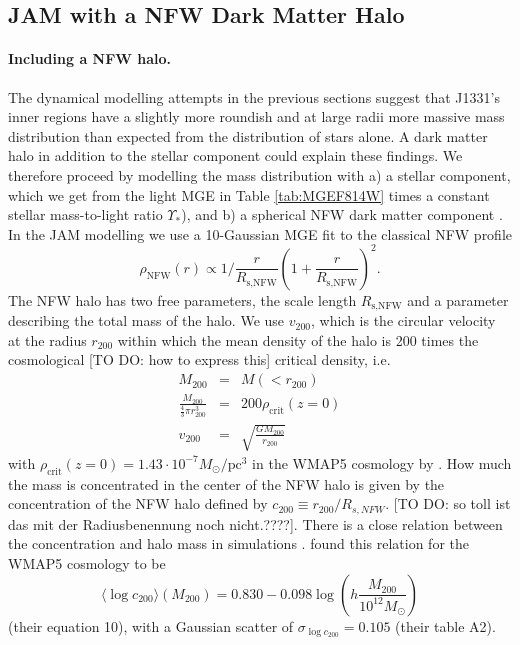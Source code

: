 \subsection{JAM with a NFW Dark Matter Halo}

\paragraph{Including a NFW halo.} The dynamical modelling attempts in the previous sections suggest that J1331's inner regions have a slightly more roundish and at large radii more massive mass distribution than expected from the distribution of stars alone. A dark matter halo in addition to the stellar component could explain these findings. We therefore proceed by modelling the mass distribution with a) a stellar component, which we get from the light MGE in Table \ref{tab:MGEF814W} times a constant stellar mass-to-light ratio $\Upsilon_*$), and b) a spherical NFW dark matter component \citep{Navarro+1995c,NFW96}. In the JAM modelling we use a 10-Gaussian MGE fit to the classical NFW profile
\begin{equation*}
\rho_\text{NFW}(r) \propto 1 / \frac{r}{R_\text{s,NFW}} \left( 1 + \frac{r}{R_\text{s,NFW}} \right)^2.
\end{equation*}
The NFW halo has two free parameters, the scale length $R_\text{s,NFW}$ and a parameter describing the total mass of the halo. We use $v_\text{200}$, which is the circular velocity at the radius $r_\text{200}$ within which the mean density of the halo is 200 times the cosmological [TO DO: how to express this] critical density, i.e.
\begin{eqnarray*}
M_\text{200} &=& M(<r_{200})\\
\frac{M_{200}}{ \frac 43 \pi r_{200}^3} &=& 200 \rho_\text{crit}(z=0) \\
v_\text{200} &=& \sqrt{\frac{GM_{200}}{r_\text{200}}}
\end{eqnarray*}
with $\rho_\text{crit}(z=0)=1.43 \cdot 10^{-7} M_\odot / \text{pc}^3$ in the WMAP5 cosmology by \citet{WMAP5cosm}. How much the mass is concentrated in the center of the NFW halo is given by the concentration of the NFW halo defined by $c_{200}\equiv r_{200} / R_{s,NFW}$. [TO DO: so toll ist das mit der Radiusbenennung noch nicht.????]. There is a close relation between the concentration and halo mass in simulations \citep{NFW96}. \citet{Maccio08} found this relation for the WMAP5 cosmology \citep{WMAP5cosm} to be
\begin{equation}
\langle \log c_{200} \rangle (M_{200}) = 0.830 - 0.098 \log \left(h \frac{M_{200}}{10^{12} M_\odot} \right) \label{eq:Maccio08}
\end{equation}
(their equation 10), with a Gaussian scatter of $\sigma_{\log c_{200}} = 0.105$ (their table A2).


